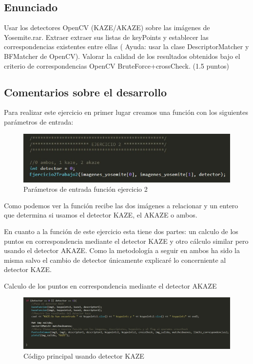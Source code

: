 \subsection{Enunciado}

 Usar los detectores OpenCV (KAZE/AKAZE) sobre las imágenes de Yosemite.rar. Extraer extraer sus listas de keyPoints y establecer las correspondencias existentes entre ellas ( Ayuda: usar la clase DescriptorMatcher y BFMatcher de OpenCV). Valorar la calidad de los resultados obtenidos bajo el criterio de correspondencias OpenCV BruteForce+crossCheck. (1.5 puntos)

\subsection{Comentarios sobre el desarrollo}

Para realizar este ejercicio en primer lugar creamos una función con los siguientes parámetros de entrada:

\begin{figure}[H]
\centering
\includegraphics[width=0.8\linewidth]{cabecera_ej2}
\caption{Parámetros de entrada función ejercicio 2}
\label{fig:cabeceraej2}
\end{figure}

Como podemos ver la función recibe las dos imágenes a relacionar y un entero que determina si usamos el detector KAZE, el AKAZE o ambos.

En cuanto a la función de este ejercicio esta tiene dos partes: un calculo de los puntos en correspondencia mediante el detector KAZE y otro cálculo similar pero usando el detector AKAZE. Como la metodología a seguir en ambos ha sido la misma salvo el cambio de detector únicamente explicaré lo concerniente al detector KAZE.

Calculo de los puntos en correspondencia mediante el detector AKAZE
	
	\begin{figure}[H]
\centering
\includegraphics[width=0.8\linewidth]{codigokaze}
\caption{Código principal usando detector KAZE}
\label{fig:codigokaze}
\end{figure}

